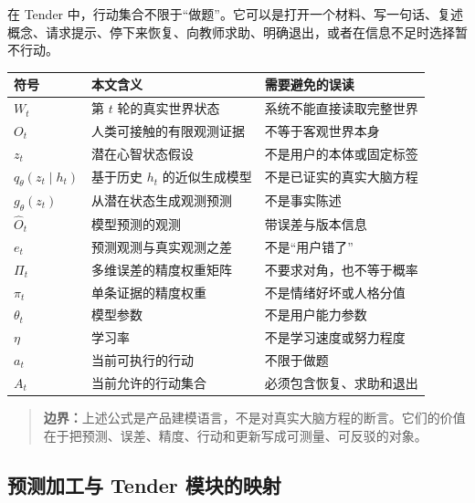 \documentclass[UTF8,a4paper,11pt]{ctexart}
\newcommand{\boundary}[1]{\begin{quote}\noindent\textbf{\color{TenderPink}边界：}#1\end{quote}}
\begin{document}
在 Tender 中，行动集合不限于“做题”。它可以是打开一个材料、写一句话、复述概念、请求提示、停下来恢复、向教师求助、明确退出，或者在信息不足时选择暂不行动。

\begin{center}
\begin{longtable}{@{}p{2.7cm}p{5.3cm}p{5.1cm}@{}}
\toprule
\textbf{符号} & \textbf{本文含义} & \textbf{需要避免的误读} \\
\midrule
\(W_t\) & 第 \(t\) 轮的真实世界状态 & 系统不能直接读取完整世界 \\
\(O_t\) & 人类可接触的有限观测证据 & 不等于客观世界本身 \\
\(z_t\) & 潜在心智状态假设 & 不是用户的本体或固定标签 \\
\(q_\theta(z_t\mid h_t)\) & 基于历史 \(h_t\) 的近似生成模型 & 不是已证实的真实大脑方程 \\
\(g_\theta(z_t)\) & 从潜在状态生成观测预测 & 不是事实陈述 \\
\(\hat O_t\) & 模型预测的观测 & 带误差与版本信息 \\
\(e_t\) & 预测观测与真实观测之差 & 不是“用户错了” \\
\(\Pi_t\) & 多维误差的精度权重矩阵 & 不要求对角，也不等于概率 \\
\(\pi_t\) & 单条证据的精度权重 & 不是情绪好坏或人格分值 \\
\(\theta_t\) & 模型参数 & 不是用户能力参数 \\
\(\eta\) & 学习率 & 不是学习速度或努力程度 \\
\(a_t\) & 当前可执行的行动 & 不限于做题 \\
\(A_t\) & 当前允许的行动集合 & 必须包含恢复、求助和退出 \\
\bottomrule
\end{longtable}
\end{center}

\boundary{上述公式是产品建模语言，不是对真实大脑方程的断言。它们的价值在于把预测、误差、精度、行动和更新写成可测量、可反驳的对象。}

\subsection{预测加工与 Tender 模块的映射}
\end{document}
